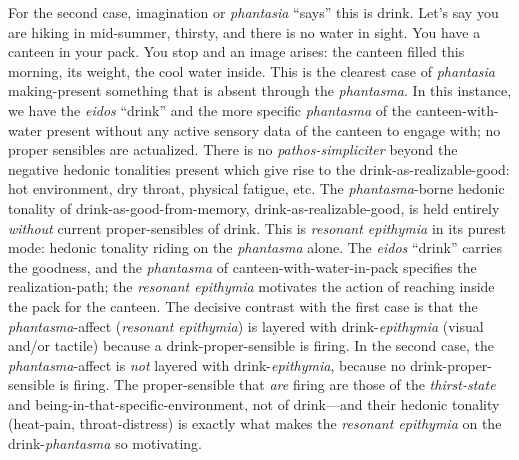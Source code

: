 \documentclass{article}
\begin{document}
For the second case, imagination or \textit{phantasia} ``says'' this is drink. Let's say you are hiking in mid-summer, thirsty, and there is no water in sight. You have a canteen in your pack. You stop and an image arises: the canteen filled this morning, its weight, the cool water inside. This is the clearest case of \textit{phantasia} making-present something that is absent through the \textit{phantasma}. In this instance, we have the \textit{eidos} ``drink'' and the more specific \textit{phantasma} of the canteen-with-water present without any active sensory data of the canteen to engage with; no proper sensibles are actualized. There is no \textit{pathos-simpliciter} beyond the negative hedonic tonalities present which give rise to the drink-as-realizable-good: hot environment, dry throat, physical fatigue, etc. The \textit{phantasma}-borne hedonic tonality of drink-as-good-from-memory, drink-as-realizable-good, is held entirely \textit{without} current proper-sensibles of drink. This is \textit{resonant epithymia} in its purest mode: hedonic tonality riding on the \textit{phantasma} alone. The \textit{eidos} ``drink'' carries the goodness, and the \textit{phantasma} of canteen-with-water-in-pack specifies the realization-path; the \textit{resonant epithymia} motivates the action of reaching inside the pack for the canteen. The decisive contrast with the first case is that the \textit{phantasma}-affect (\textit{resonant epithymia}) is layered with drink-\textit{epithymia} (visual and/or tactile) because a drink-proper-sensible is firing. In the second case, the \textit{phantasma}-affect is \textit{not} layered with drink-\textit{epithymia}, because no drink-proper-sensible is firing. The proper-sensible that \textit{are} firing are those of the \textit{thirst-state} and being-in-that-specific-environment, not of drink---and their hedonic tonality (heat-pain, throat-distress) is exactly what makes the \textit{resonant epithymia} on the drink-\textit{phantasma} so motivating. 
\end{document}
